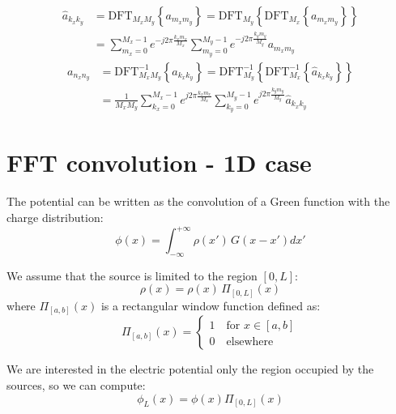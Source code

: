 \begin{equation}
\begin{split}
\hat{a}_{k_xk_y} &= \text{DFT}_{M_xM_y}\left\{a_{m_xm_y}\right\}  
= \text{DFT}_{M_y} \left\{\text{DFT}_{M_x}\left\{a_{m_xm_y}\right\}\right\}\\  
&=\sum_{m_x=0}^{M_x-1} e^{-j 2\pi  \frac{k_x m_x}{M_x}} 
\sum_{m_y=0}^{M_y-1} e^{-j 2\pi  \frac{k_y m_y}{M_y}} a_{m_xm_y}
\end{split}
\end{equation}
\begin{equation}
\begin{split}
{a}_{n_xn_y} &= \text{DFT}^{-1}_{M_xM_y}\left\{a_{k_x k_y}\right\}  
= \text{DFT}^{-1}_{M_y} \left\{\text{DFT}^{-1}_{M_x}\left\{\hat{a}_{k_x k_y}\right\}\right\}\\  
&=\frac{1}{M_x M_y}\sum_{k_x=0}^{M_x-1} e^{j 2\pi  \frac{k_x m_x}{M_x}} 
\sum_{k_y=0}^{M_y-1} e^{j 2\pi  \frac{k_y m_y}{M_y}} \hat{a}_{k_xk_y}
\end{split}
\end{equation}

\section{FFT convolution - 1D case}
\label{sec:fftconv1d}
The potential can be written as the convolution of a Green function with the charge distribution:
\begin{equation}
\phi(x) = \int_{-\infty}^{+\infty} \rho(x')\,G(x-x') dx'
\label{eq:conv}
\end{equation}

We assume that the source is limited to the region  $[0, L]$:
\begin{equation}
\rho(x) = \rho(x)\,\Pi_{[0,L]}\left(x\right)
\label{eq:rholim}
\end{equation}
where $\Pi_{[a,b]}(x)$ is a rectangular window function defined as:
\begin{equation}
\Pi_{[a,b]}(x) = 
\begin{cases}
1\quad\text{for } x \in [a, b]\\
0\quad\text{elsewhere}
\end{cases}
\end{equation}

We are interested in the electric potential only the region occupied by the sources, so we can compute:
\begin{equation}
\phi_L(x) = \phi(x) \Pi_{[0, L]}\left(x\right)
\label{eq:philim}
\end{equation}

